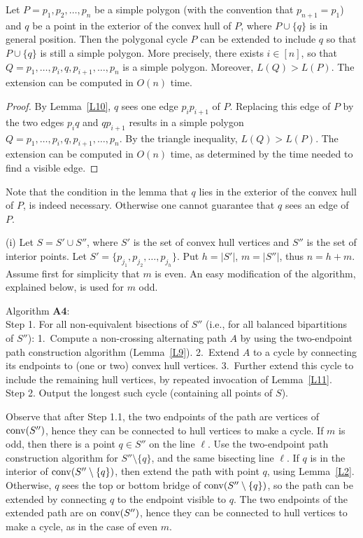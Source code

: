 \documentclass[proceedings]{stacs}
\begin{document}
\begin{lemma} \label{L11}
Let $P=p_1, p_2, \ldots, p_n$ be a simple polygon (with the convention
that $p_{n+1}=p_1$) and $q$ be a point
in the exterior of the convex hull of $P$, where $P \cup \{q\}$
is in general position. Then the polygonal cycle
$P$ can be extended to include $q$ so that $P \cup \{q\}$ is
still a simple polygon. More precisely, there exists $i \in [n]$, so that
$Q= p_1, \ldots, p_i, q, p_{i+1}, \ldots, p_n$ is a simple polygon.
Moreover, $L(Q)>L(P)$. The extension can be computed in $O(n)$ time.
\end{lemma}
\begin{proof}
By Lemma~\ref{L10}, $q$ sees one edge $p_i p_{i+1}$ of $P$.
Replacing this edge of $P$ by the two edges $p_i q $ and $q p_{i+1}$
results in a simple polygon $Q= p_1, \ldots, p_i, q, p_{i+1}, \ldots, p_n$.
By the triangle inequality, $L(Q)>L(P)$.
The extension can be computed in $O(n)$ time, as determined by the
time needed to find a visible edge.
\end{proof}

\smallskip
Note that the condition in the lemma that $q$ lies in the exterior of
the convex hull of $P$, is indeed necessary. Otherwise one cannot
guarantee that $q$ sees an edge of $P$.


\smallskip
{\rm (i)} Let $S=S' \cup S''$, where $S'$ is the set of convex hull
vertices and $S''$ is the set of interior points.
Let $S'=\{p_{j_1}, p_{j_2}, \ldots, p_{j_h}\}$.
Put $h =|S'|$, $m =|S''|$, thus $n=h+m$. Assume first for simplicity that
$m$ is even. An easy modification of the algorithm, explained below, is used
for $m$ odd.

\smallskip
\noindent Algorithm {\bf A4}: \\
{\sc Step 1.} For all non-equivalent
bisections of  $S''$ (i.e., for all balanced bipartitions of $S''$):
1.~Compute a non-crossing alternating path $A$ by using the two-endpoint path
construction algorithm (Lemma~\ref{L9}).
2.~Extend $A$ to a cycle by connecting its endpoints to (one or two)
convex hull vertices. 3.~Further extend this cycle to include the
remaining hull vertices, by repeated invocation of Lemma~\ref{L11}. \\
{\sc Step 2.} Output the longest such cycle (containing all points of $S$).

\smallskip
Observe that after {\sc Step 1.}1, the two endpoints of the path are vertices
of ${\rm conv}(S'')$, hence they can be connected to hull vertices to make a cycle.
If $m$ is odd, then there is a point $q \in S''$ on the line $\ell$.
Use the two-endpoint path construction algorithm for $S''\setminus\{q\}$, and
the same bisecting line $\ell$. If $q$ is in the interior of
${\rm conv}(S''\setminus \{q\})$, then extend the path with point $q$, using
Lemma~\ref{L2}. Otherwise, $q$ sees the top or bottom bridge of
${\rm conv}(S''\setminus \{q\})$, so the path can be extended by connecting $q$
to the endpoint visible to $q$. The two endpoints of the extended path are on
${\rm conv}(S'')$, hence they can be connected to hull vertices to make a
cycle, as in the case of even $m$.
\end{document}
